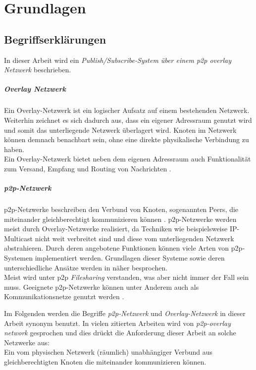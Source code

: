 \chapter{Grundlagen}
\label{chap:grundlagen}

\section{Begriffserklärungen}
In dieser Arbeit wird ein \emph{Publish/Subscribe-System über einem \ac{p2p} overlay Netzwerk} beschrieben.


\paragraph{Overlay Netzwerk} Ein Overlay-Netzwerk ist ein logischer Aufsatz auf einem bestehenden Netzwerk. Weiterhin zeichnet es sich dadurch aus, dass ein eigener Adressraum genutzt wird und somit das unterliegende Netzwerk überlagert wird. Knoten im Netzwerk können demnach benachbart sein, ohne eine direkte physikalische Verbindung zu haben.\\
Ein Overlay-Netzwerk bietet neben dem eigenen Adressraum auch Funktionalität zum Versand, Empfang und Routing von Nachrichten \cite{Tannenbaum2003}. 

\paragraph{\ac{p2p}-Netzwerk} p2p-Netzwerke beschreiben den Verbund von Knoten, sogenannten Peers, die miteinander gleichberechtigt kommunizieren können \cite{Steinmetz2005}. p2p-Netzwerke werden meist durch Overlay-Netzwerke realisiert, da Techniken wie beispielsweise IP-Multicast \cite{Deering1990Multicast} nicht weit verbreitet sind und diese vom unterliegenden Netzwerk abstrahieren. Durch deren angebotene Funktionen können viele Arten von p2p-Systemen implementiert werden. Grundlagen dieser Systeme sowie deren unterschiedliche Ansätze werden in  näher besprochen.\\
Meist wird unter p2p \emph{Filesharing} verstanden, was aber nicht immer der Fall sein muss. Geeignete p2p-Netzwerke können unter Anderem auch als Kommunikationsnetze genutzt werden \cite{Darlagiannis2006Peertopeer}.

Im Folgenden werden die Begriffe \emph{p2p-Netzwerk} und \emph{Overlay-Netzwerk} in dieser Arbeit synonym benutzt. In vielen zitierten Arbeiten wird von \emph{p2p-overlay network} gesprochen und dies drückt die Anforderung dieser Arbeit an solche Netzwerke aus:\\
Ein vom physischen Netzwerk (räumlich) unabhängiger Verbund aus gleichberechtigten Knoten die miteinander kommunizieren können.

